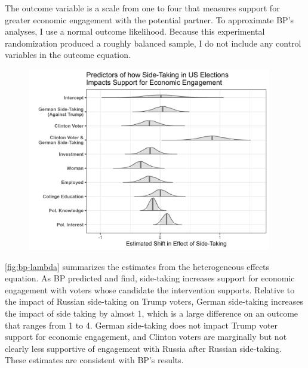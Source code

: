 \documentclass[12pt]{article}
\begin{document}
The outcome variable is a scale from one to four that measures support for greater economic engagement with the potential partner. 
To approximate BP's analyses, I use a normal outcome likelihood. 
Because this experimental randomization produced a roughly balanced sample, I do not include any control variables in the outcome equation. 


\begin{figure}[htpb]
	\centering
		\includegraphics[width=0.95\textwidth]{../figures/bp-lambda.png}
	\caption{}
	\label{fig:bp-lambda}
\end{figure}


\autoref{fig:bp-lambda} summarizes the estimates from the heterogeneous effects equation. 
As BP predicted and find, side-taking increases support for economic engagement with voters whose candidate the intervention supports. 
Relative to the impact of Russian side-taking on Trump voters, German side-taking increases the impact of side taking by almost 1, which is a large difference on an outcome that ranges from 1 to 4. 
German side-taking does not impact Trump voter support for economic engagement, and Clinton voters are marginally but not clearly less supportive of engagement with Russia after Russian side-taking.
These estimates are consistent with BP's results. 
\end{document}
